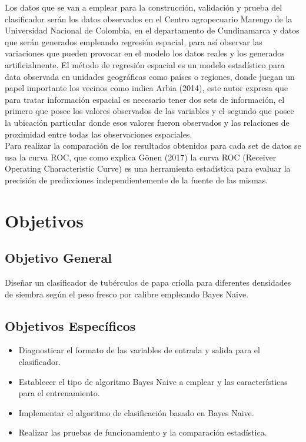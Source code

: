 Los datos que se van a emplear para la construcción, validación y prueba del clasificador serán los datos observados en el Centro agropecuario Marengo de la Universidad Nacional de Colombia, en el departamento de Cundinamarca y datos que serán generados empleando regresión espacial, para así observar las variaciones que pueden provocar en el modelo los datos reales y los generados artificialmente. El método de regresión espacial es un modelo estadístico para data observada en unidades geográficas como países o regiones, donde juegan un papel importante los vecinos como indica Arbia (2014), este autor expresa que para tratar información espacial es necesario tener dos sets de información, el primero que posee los valores observados de las variables y el segundo que posee la ubicación particular donde esos valores fueron observados y las relaciones de proximidad entre todas las observaciones espaciales.\\

Para realizar la comparación de los resultados obtenidos para cada set de datos se usa la curva ROC, que como explica Gönen (2017) la curva ROC (Receiver Operating Characteristic Curve) es una herramienta estadística para evaluar la precisión de predicciones independientemente de la fuente de las mismas.

\section{Objetivos}

\subsection{Objetivo General}

Diseñar un clasificador de tubérculos de papa criolla para diferentes densidades de siembra según el peso fresco por calibre empleando Bayes Naive.

\subsection{Objetivos Espec\'ificos}
 
\begin{itemize}
\item  Diagnosticar el formato de las variables de entrada y salida para el clasificador.
\item	 Establecer el tipo de algoritmo Bayes Naive a emplear  y las características para el entrenamiento.
\item  Implementar el algoritmo de clasificación basado en Bayes Naive.
\item  Realizar las pruebas de funcionamiento y la comparación estadística.
\end{itemize}

